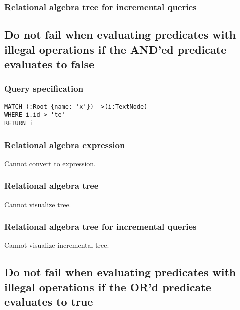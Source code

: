 \subsubsection*{Relational algebra tree for incremental queries}


\subsection{Do not fail when evaluating predicates with illegal operations if the AND'ed predicate evaluates to false}

\subsubsection*{Query specification}

\begin{lstlisting}
MATCH (:Root {name: 'x'})-->(i:TextNode)
WHERE i.id > 'te'
RETURN i
\end{lstlisting}

\subsubsection*{Relational algebra expression}

Cannot convert to expression.

\subsubsection*{Relational algebra tree}

Cannot visualize tree.

\subsubsection*{Relational algebra tree for incremental queries}

Cannot visualize incremental tree.

\subsection{Do not fail when evaluating predicates with illegal operations if the OR'd predicate evaluates to true}

